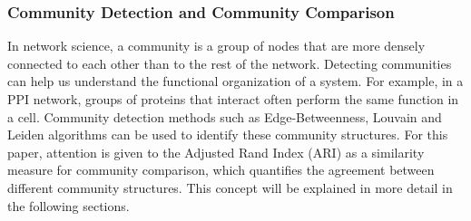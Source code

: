 \subsubsection{Community Detection and Community Comparison}
In network science, a community is a group of nodes that are more densely connected to each other than
to the rest of the network. Detecting communities can help us understand the functional 
organization of a system. For example, in a PPI network, groups of proteins that interact often perform
the same function in a cell.
Community detection methods such as Edge-Betweenness, Louvain and Leiden algorithms 
can be used to identify these community structures.
For this paper, 
attention is given to the Adjusted Rand Index (ARI) as a similarity measure for community comparison, 
which quantifies the agreement between different community structures. 
This concept will be explained in more detail in the following sections.







